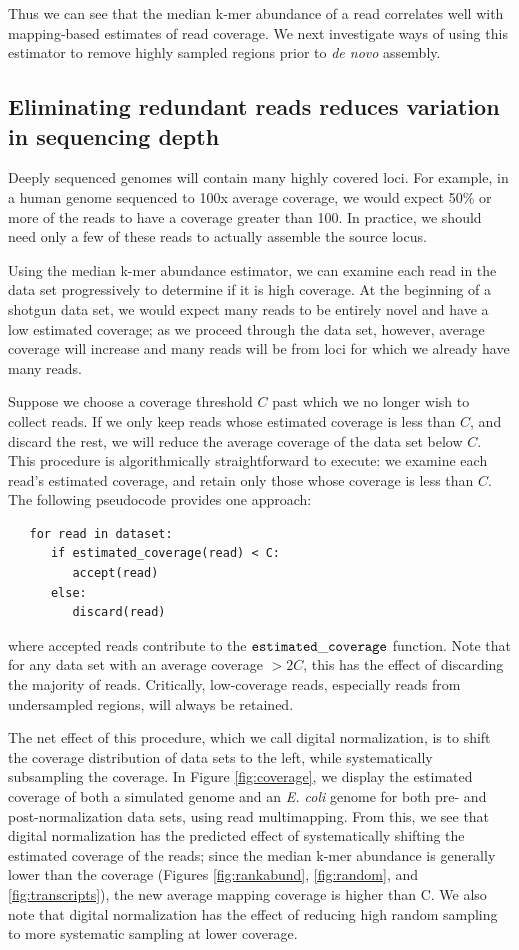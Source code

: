 \documentclass[10pt]{article}
\begin{document}
Thus we can see that the median k-mer abundance of a read correlates
well with mapping-based estimates of read coverage.
We next investigate ways of using this estimator to remove highly
sampled regions prior to {\em de novo} assembly.

\subsection*{Eliminating redundant reads reduces variation in sequencing depth}

Deeply sequenced genomes will contain many highly covered loci.  For
example, in a human genome sequenced to 100x average coverage, we would
expect 50\% or more of the reads to have a coverage greater than 100.
In practice, we should need only a few of these reads to actually assemble
the source locus.

Using the median k-mer abundance estimator, we can examine each read
in the data set progressively to determine if it is high coverage.  At
the beginning of a shotgun data set, we would expect many reads to be
entirely novel and have a low estimated coverage; as we proceed
through the data set, however, average coverage will increase and many
reads will be from loci for which we already have many reads.

Suppose we choose a coverage threshold $C$ past which we no longer
wish to collect reads. If we only keep reads whose estimated coverage
is less than $C$, and discard the rest, we will reduce the average
coverage of the data set below $C$.  This procedure is
algorithmically straightforward to execute: we examine each read's
estimated coverage, and retain only those whose coverage is less than $C$.
The following pseudocode provides one approach:
\begin{verbatim}
   for read in dataset:
      if estimated_coverage(read) < C:
         accept(read)
      else:
         discard(read)
\end{verbatim}
\noindent
where accepted reads contribute to the $\tt estimated\_coverage$
function.  Note that for any data set with an average coverage $> 2C$,
this has the effect of discarding the majority of reads.  Critically,
low-coverage reads, especially reads from undersampled regions, will
always be retained.

The net effect of this procedure, which we call digital normalization,
is to shift the coverage distribution of data sets to the left, while
systematically subsampling the coverage.  In Figure
\ref{fig:coverage}, we display the estimated coverage of both a
simulated genome and an {\em E. coli} genome for both pre- and
post-normalization data sets, using read multimapping.  From this, we
see that digital normalization has the predicted effect of
systematically shifting the estimated coverage of the reads; since the
median k-mer abundance is generally lower than the coverage (Figures
\ref{fig:rankabund}, \ref{fig:random}, and \ref{fig:transcripts}), the
new average mapping coverage is higher than C.  We also note that
digital normalization has the effect of reducing high random sampling
to more systematic sampling at lower coverage.
\end{document}
